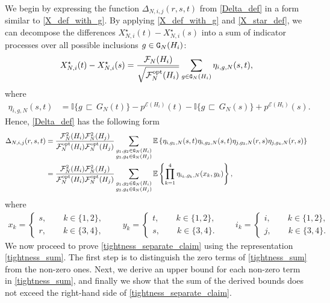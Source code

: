 \documentclass[11pt,reqno]{amsart}
\numberwithin{equation}{section}
\newcommand{\E}[1]{\mathbb{E}\left\{ #1\right\}}
\begin{document}
{We begin by expressing the function $\Delta_{N,i,j}(r,s,t)$ from \eqref{Delta_def} in a form similar to \eqref{X_def_with_g}. By applying \eqref{X_def_with_g} and \eqref{X_star_def}, we can decompose the differences $X^{\star}_{N,i}(t) - X^{\star}_{N,i}(s)$ into a sum of indicator processes over all possible inclusions $g \in {\tt G}_N(H_i)$:}
\begin{align*}
    X^{\star}_{N,i}(t)-X^{\star}_{N,i}(s) = \frac{\mathcal{F}_N({H}_i)}{\sqrt{\mathcal{F}^{\rm opt}_N({H}_i)}}\sum_{g\in{\tt G}_N({H}_i)}\eta_{i,g,N}(s,t),
\end{align*}
{where}
\begin{align}
    \eta_{i,g,N}(s,t) &= \mathbb{I}\{g{\,\sqsubset\,} G_N(t)\} - p^{\mathcal{E}({H}_i)}(t) - \mathbb{I}\{g{\,\sqsubset\,} G_N(s)\} + p^{\mathcal{E}({H}_i)}(s).\label{nu_def}
\end{align}
{Hence, \eqref{Delta_def} has the following form}
\begin{align}
    \Delta_{N,i,j}(r,s,t) &= \frac{\mathcal{F}_N^2({H}_i)\mathcal{F}_N^2({H}_j)}{\mathcal{F}^{\rm opt}_N({H}_i)\mathcal{F}^{\rm opt}_N({H}_j)}\sum_{\substack{g_1,g_2\in {\tt G}_N({H}_i)\\ g_3,g_4\in {\tt G}_N({H}_j)}} \E{\eta_{i,g_1,N}(s,t)\eta_{i,g_2,N}(s,t)\eta_{j,g_3,N}(r,s)\eta_{j,g_4,N}(r,s)}\notag\\
    &= \frac{\mathcal{F}_N^2({H}_i)\mathcal{F}_N^2({H}_j)}{\mathcal{F}^{\rm opt}_N({H}_i)\mathcal{F}^{\rm opt}_N({H}_j)}\sum_{\substack{g_1,g_2\in {\tt G}_N({H}_i)\\ g_3,g_4\in {\tt G}_N({H}_j)}} \E{\prod_{k=1}^{4}\eta_{i_k,g_k,N}(x_k,y_k)},\label{tightness_sum}
\end{align}
where
\begin{align*}
    x_k = \begin{cases} s,\qquad k\in\{1,2\},\\
        r,\qquad k\in\{3,4\},
    \end{cases}\qquad 
    y_k = \begin{cases} t,\qquad k\in\{1,2\},\\
        s,\qquad k\in\{3,4\}.
    \end{cases}\qquad
    i_k = \begin{cases} i,\qquad k\in\{1,2\},\\
        j,\qquad k\in\{3,4\}.
    \end{cases}
\end{align*}
{We now proceed to prove \eqref{tightness_separate_claim} using the representation \eqref{tightness_sum}. The first step is to distinguish the zero terms of \eqref{tightness_sum} from the non-zero ones. Next, we derive an upper bound for each non-zero term in \eqref{tightness_sum}, and finally we show that the sum of the derived bounds does not exceed the right-hand side of \eqref{tightness_separate_claim}.}
\end{document}
